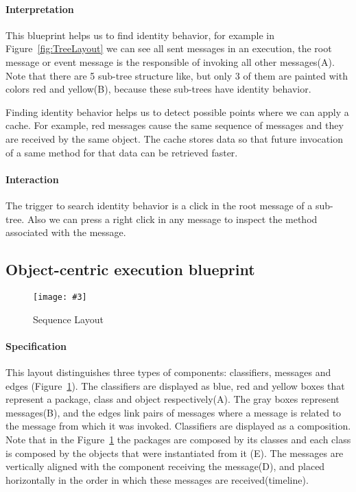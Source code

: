 \documentclass{sig-alternate}
\newcommand{\fig}[4]{
	\begin{figure}[#1]
		\centering
		\texttt{[image: \#3]}
		\caption{\label{fig:#3}#4}
	\end{figure}}
\newcommand{\figref}[1]{Figure~\ref{fig:#1}}
\begin{document}
\paragraph{Interpretation}

This blueprint helps us to find identity behavior, for example in \figref{TreeLayout} we can see all sent messages in an execution, the root message or event message is the responsible of invoking all other messages(A).  Note that there are 5 sub-tree structure like, but only 3 of them are painted with colors red and yellow(B), because these sub-trees have identity behavior.

Finding identity behavior helps us to detect possible points where we can apply a cache. For example, red messages cause the same sequence of messages and they are received by the same object. The cache stores data so that future invocation of a same method for that data can be retrieved faster.

\paragraph{Interaction}

The trigger to search identity behavior is a click in the root message of a sub-tree. Also we can press a right click in any message to inspect the method associated with the message.

\subsection{Object-centric execution blueprint}

\fig{}{0.5}{Demo}{Sequence Layout}

\paragraph{Specification}

This layout distinguishes three types of components: classifiers, messages and edges (\figref{Demo}). The classifiers are displayed as blue, red and yellow boxes that represent a package, class and object respectively(A). The gray boxes represent messages(B), and the edges link pairs of messages where a message is related to the message from which it was invoked.
Classifiers are displayed as a composition. Note that in the \figref{Demo} the packages are composed by its classes and each class is composed by the objects that were instantiated from it (E).
The messages are vertically aligned with the component receiving the message(D), and placed horizontally in the order in which these messages are received(timeline).
\end{document}
